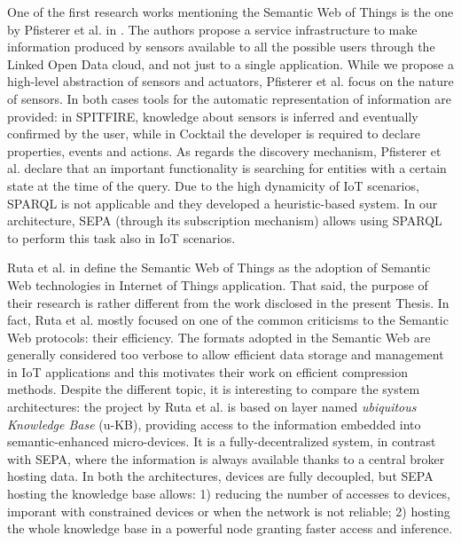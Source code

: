 One of the first research works mentioning the Semantic Web of Things is the one by Pfisterer et al. in \cite{pfisterer2011spitfire}. The authors propose a service infrastructure to make information produced by sensors available to all the possible users through the Linked Open Data cloud, and not just to a single application. While we propose a high-level abstraction of sensors and actuators, Pfisterer et al. focus on the nature of sensors. In both cases tools for the automatic representation of information are provided: in SPITFIRE, knowledge about sensors is inferred and eventually confirmed by the user, while in Cocktail the developer is required to declare properties, events and actions. As regards the discovery mechanism, Pfisterer et al. declare that an  important  functionality is searching  for entities  with a  certain  state  at the time of the query. Due to the high dynamicity of IoT scenarios, SPARQL is not applicable and they developed a heuristic-based system. In our architecture, SEPA (through its subscription mechanism) allows using SPARQL to perform this task also in IoT scenarios.

Ruta et al. in \cite{ruta2012enabling} define the Semantic Web of Things as the adoption of Semantic Web technologies in Internet of Things application. That said, the purpose of their research is rather different from the work
disclosed in the present Thesis. In fact, Ruta et al. mostly focused on one of the common criticisms to the Semantic Web protocols: their efficiency. The formats adopted in the Semantic Web are generally considered too verbose to allow efficient data storage and management in IoT applications and this motivates their work on efficient compression methods. Despite the different topic, it is interesting to compare the system architectures: the project by Ruta et al. is based on layer named \textit{ubiquitous Knowledge Base} (u-KB), providing access to the information embedded into semantic-enhanced micro-devices. It is a fully-decentralized system, in contrast with SEPA, where the information is always available thanks to a central broker hosting data. In both the architectures, devices are fully decoupled, but SEPA hosting the knowledge base allows: 1) reducing the number of accesses to devices, imporant with constrained devices or when the network is not reliable; 2) hosting the whole knowledge base in a powerful node granting faster access and inference.

